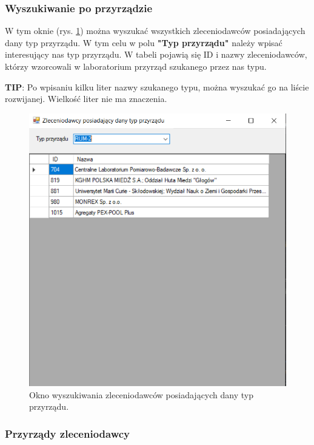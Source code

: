 \subsubsection{Wyszukiwanie po przyrządzie}
\label{wysz_po_przyrzadzie}

W tym oknie (rys. \ref{wyszPoPrzyrzadzie}) można wyszukać wszystkich zleceniodawców posiadających dany typ przyrządu. W tym celu w polu \textbf{"Typ przyrządu"} należy wpisać interesujący nas typ przyrządu. W tabeli pojawią się ID i nazwy zleceniodawców, którzy wzorcowali w laboratorium przyrząd szukanego przez nas typu. 

\textbf{TIP}: Po wpisaniu kilku liter nazwy szukanego typu, można wyszukać go na liście rozwijanej. Wielkość liter nie ma znaczenia.

\begin{figure}[htb]
	\centering
	\includegraphics{obrazki/Wyszukiwanie/Zleceniodawcy/wyszukiwanie_po_przyrzadzie.png}
	\caption{Okno wyszukiwania zleceniodawców posiadających dany typ przyrządu.}
	\label{wyszPoPrzyrzadzie}
\end{figure}

\subsubsection{Przyrządy zleceniodawcy}
\label{przyrz_zleceniodawcy}

